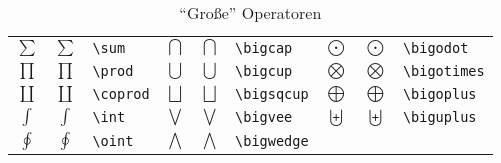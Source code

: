 \begin{table}[!htbp]
\caption{"`Große"' Operatoren}
\begin{trivlist}\item
\begin{tabular}{@{}ccl@{\qquad}cll@{\qquad}ccl@{}}
$\sum$     & $\displaystyle \sum$    & \lstinline|\sum|
  & $\bigcap$    & $\displaystyle\bigcap$    & \lstinline|\bigcap|
  & $\bigodot$   & $\displaystyle\bigodot$   & \lstinline|\bigodot| \\[6pt]
$\prod$    & $\displaystyle\prod$    & \lstinline|\prod|
  & $\bigcup$    & $\displaystyle\bigcup$    & \lstinline|\bigcup|
  & $\bigotimes$ & $\displaystyle\bigotimes$ & \lstinline|\bigotimes| \\[6pt]
$\coprod$  & $\displaystyle\coprod$  & \lstinline|\coprod|
  & $\bigsqcup$  & $\displaystyle\bigsqcup$  & \lstinline|\bigsqcup|
  & $\bigoplus$  & $\displaystyle\bigoplus$  & \lstinline|\bigoplus| \\[6pt]
$\int$     & $\displaystyle\int$     & \lstinline|\int|
  & $\bigvee$    & $\displaystyle\bigvee$    & \lstinline|\bigvee|
  & $\biguplus$  & $\displaystyle\biguplus$  & \lstinline|\biguplus| \\[6pt]
$\oint$    & $\displaystyle\oint$    & \lstinline|\oint|
  & $\bigwedge$  & $\displaystyle\bigwedge$  & \lstinline|\bigwedge|
\end{tabular}
\end{trivlist}
\end{table}


